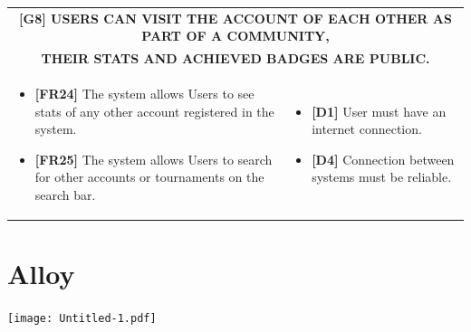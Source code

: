 \documentclass{article}
\begin{document}
\begin{table}
\begin{adjustwidth}{-1in}{-1in}
 \renewcommand{\arraystretch}{1.5}
    \begin{tabular}{|p{9.5cm}|p{9.5cm}|}
        \hline
        \multicolumn{2}{|c|}{\textbf{[G8] USERS CAN VISIT THE ACCOUNT OF EACH OTHER AS PART OF A COMMUNITY,}} \\
        \multicolumn{2}{|c|}{\textbf{THEIR STATS AND ACHIEVED BADGES ARE PUBLIC.}} \\
        \hline
        \begin{itemize}[label={}, left=0pt, align=left, itemsep=5pt]
            \item \textbf{[FR24]} The system allows Users to see stats of any other account registered in the system.
            \item \textbf{[FR25]} The system allows Users to search for other accounts or tournaments on the search bar.
        \end{itemize} &
        \begin{itemize}[label={}, left=0pt, align=left, itemsep=5pt]
            \item \textbf{[D1]} User must have an internet connection.
            \item \textbf{[D4]} Connection between systems must be reliable.
        \end{itemize} \\
        \hline
    \end{tabular}
\end{adjustwidth}
\end{table}

\newpage

\section{Alloy}
\texttt{[image: Untitled-1.pdf]}
\end{document}
